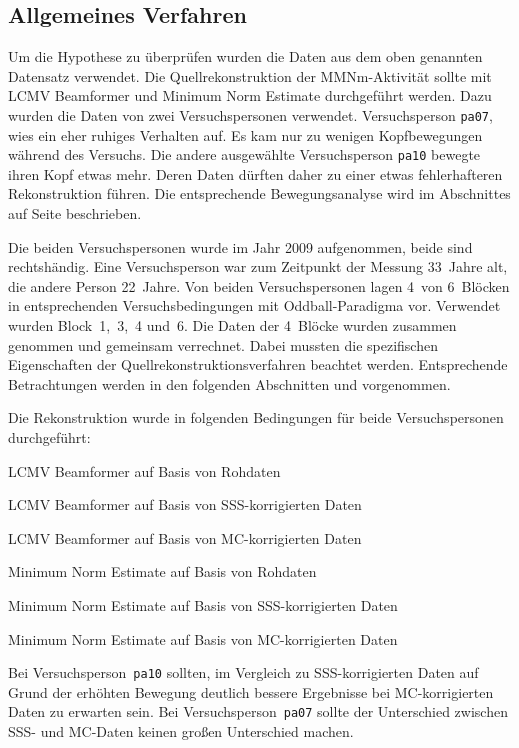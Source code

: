 \documentclass[doc,a4paper,12pt]{apa6}
\makeatletter
\DeclareRobustCommand*{\nameref}[1]{%
      \glqq{\myorg@nameref{#1}}\grqq%
    }%
\makeatother
\begin{document}
\subsection{Allgemeines Verfahren}

Um die Hypothese zu überprüfen wurden die Daten aus dem oben genannten Datensatz verwendet. Die Quellrekonstruktion der MMNm-Aktivität sollte mit LCMV Beamformer und Minimum Norm Estimate durchgeführt werden. Dazu wurden die Daten von zwei Versuchspersonen verwendet. Versuchsperson \texttt{pa07}, wies ein eher ruhiges Verhalten auf. Es kam nur zu wenigen Kopfbewegungen während des Versuchs. Die andere ausgewählte Versuchsperson \texttt{pa10} bewegte ihren Kopf etwas mehr. Deren Daten dürften daher zu einer etwas fehlerhafteren Rekonstruktion führen. Die entsprechende Bewegungsanalyse wird im Abschnittes \nameref{sec:bewegung} auf Seite \pageref{sec:bewegung} beschrieben.

Die beiden Versuchspersonen wurde im Jahr 2009 aufgenommen, beide sind rechtshändig. Eine Versuchsperson war zum Zeitpunkt der Messung 33~Jahre alt, die andere Person 22~Jahre. Von beiden Versuchspersonen lagen 4~von 6~Blöcken in entsprechenden Versuchsbedingungen mit Oddball-Paradigma vor. Verwendet wurden Block~1,~3,~4 und~6. Die Daten der 4~Blöcke wurden zusammen genommen und gemeinsam verrechnet. Dabei mussten die spezifischen Eigenschaften der Quellrekonstruktionsverfahren beachtet werden. Entsprechende Betrachtungen werden in den folgenden Abschnitten \nameref{sec:lead-beam-mne} und \nameref{sec:amplitud} vorgenommen.

Die Rekonstruktion wurde in folgenden Bedingungen für beide Versuchspersonen durchgeführt:

\begin{compactitem}
\item LCMV Beamformer auf Basis von Rohdaten
\item LCMV Beamformer auf Basis von SSS-korrigierten Daten
\item LCMV Beamformer auf Basis von MC-korrigierten Daten
\item Minimum Norm Estimate auf Basis von Rohdaten
\item Minimum Norm Estimate auf Basis von SSS-korrigierten Daten
\item Minimum Norm Estimate auf Basis von MC-korrigierten Daten
\end{compactitem}

Bei Versuchsperson~\texttt{pa10} sollten, im Vergleich zu SSS-korrigierten Daten auf Grund der erhöhten Bewegung deutlich bessere Ergebnisse bei MC-korrigierten Daten zu erwarten sein. Bei Versuchsperson~\texttt{pa07} sollte der Unterschied zwischen SSS- und MC-Daten keinen großen Unterschied machen.
\end{document}
